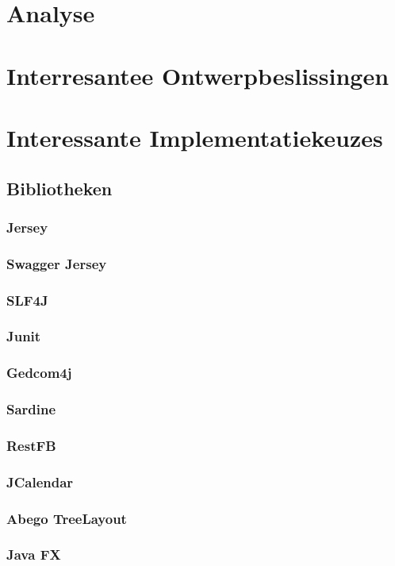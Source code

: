 \documentclass[pdftex,a4paper,12pt,twoside]{report}
\begin{document}
\chapter{Analyse}

\chapter{Interresantee Ontwerpbeslissingen}

\chapter{Interessante Implementatiekeuzes}
\section{Bibliotheken}
\subsection{Jersey}
\subsection{Swagger Jersey}
\subsection{SLF4J}
\subsection{Junit}
\subsection{Gedcom4j}
\subsection{Sardine}
\subsection{RestFB}
\subsection{JCalendar}
\subsection{Abego TreeLayout}
\subsection{Java FX}
\end{document}

